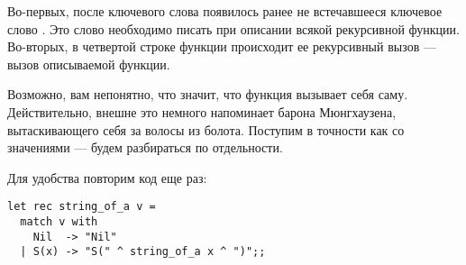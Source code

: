 Во-первых, после ключевого слова  появилось ранее не встечавшееся ключевое 
слово . Это слово необходимо писать при описании всякой рекурсивной функции. 
Во-вторых, в четвертой строке функции  происходит ее 
рекурсивный вызов --- вызов описываемой функции.

Возможно, вам непонятно, что значит, что функция вызывает себя саму. 
Действительно, внешне это немного напоминает барона Мюнгхаузена, 
вытаскивающего себя за волосы из болота. 
Поступим в точности как со значениями --- будем разбираться по отдельности.

Для удобства повторим код еще раз:

\begin{verbatim}
let rec string_of_a v =
  match v with
    Nil  -> "Nil"
  | S(x) -> "S(" ^ string_of_a x ^ ")";;
\end{verbatim}

